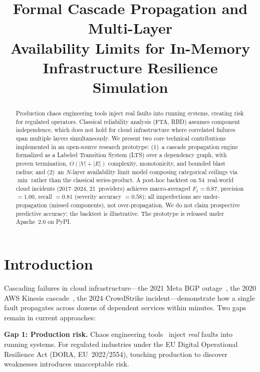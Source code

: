 \documentclass[conference,10pt]{IEEEtran}
\title{Formal Cascade Propagation and Multi-Layer\\Availability Limits for In-Memory\\Infrastructure Resilience Simulation}
\author{\IEEEauthorblockN{Anonymous Author(s)}}
\begin{document}
\maketitle

\begin{abstract}
Production chaos engineering tools inject real faults into running
systems, creating risk for regulated operators. Classical reliability
analysis (FTA, RBD) assumes component independence, which does not
hold for cloud infrastructure where correlated failures span multiple
layers simultaneously.
We present two core technical contributions implemented in an
open-source research prototype:
(1)~a cascade propagation engine formalized as a Labeled Transition
System (LTS) over a dependency graph, with proven termination,
$O(|V|{+}|E|)$ complexity, monotonicity, and bounded blast radius;
and (2)~an $N$-layer availability limit model composing categorical
ceilings via $\min$ rather than the classical series-product.
A post-hoc backtest on 54~real-world cloud incidents (2017--2024,
21~providers) achieves macro-averaged $F_1 = 0.87$, precision $= 1.00$,
recall $= 0.81$ (severity accuracy $= 0.58$); all imperfections are
under-propagation (missed components), not over-propagation. We do
not claim prospective predictive accuracy; the backtest is
illustrative. The prototype is released
under Apache~2.0 on PyPI.
\end{abstract}

\section{Introduction}\label{sec:intro}

Cascading failures in cloud infrastructure---the 2021 Meta BGP
outage~\cite{meta2021}, the 2020 AWS Kinesis cascade~\cite{aws-kinesis2020},
the 2024 CrowdStrike incident---demonstrate how a single fault
propagates across dozens of dependent services within minutes.
Two gaps remain in current approaches:

\textbf{Gap 1: Production risk.} Chaos engineering
tools~\cite{basiri2016,gremlin2020,steadybit2023,aws-fis} inject
\emph{real} faults into running systems. For regulated industries
under the EU Digital Operational Resilience Act
(DORA, EU~2022/2554), touching production to discover weaknesses
introduces unacceptable risk.
\end{document}
